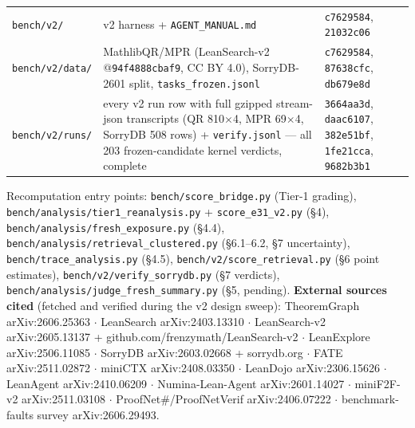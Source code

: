 \documentclass[10pt]{article}
\newcommand{\code}[1]{\texttt{#1}}
\begin{document}
{\begin{longtable}{@{}p{}p{}p{}@{}}
\code{bench/v2/} & v2 harness + \code{AGENT\_MANUAL.md} & \code{c7629584}, \code{21032c06} \\
\code{bench/v2/data/} & MathlibQR/MPR (LeanSearch-v2 @\code{94f4888cbaf9}, CC BY 4.0), SorryDB-2601 split, \code{tasks\_frozen.jsonl} & \code{c7629584}, \code{87638cfc}, \code{db679e8d} \\
\code{bench/v2/runs/} & every v2 run row with full gzipped stream-json transcripts (QR 810$\times$4, MPR 69$\times$4, SorryDB 508 rows) + \code{verify.jsonl} --- all 203 frozen-candidate kernel verdicts, complete & \code{3664aa3d}, \code{daac6107}, \code{382e51bf}, \code{1fe21cca}, \code{9682b3b1} \\
\end{longtable}
}

{\sloppy\scriptsize
\enlargethispage{3\baselineskip}%
Recomputation entry points: \code{bench/score\_bridge.py} (Tier-1 grading),
\code{bench/analysis/tier1\_reanalysis.py} + \code{score\_e31\_v2.py}
(\S4), \code{bench/analysis/fresh\_exposure.py} (\S4.4),
\code{bench/analysis/retrieval\_clustered.py} (\S6.1--6.2, \S7
uncertainty), \code{bench/trace\_analysis.py} (\S4.5),
\code{bench/v2/score\_retrieval.py} (\S6 point estimates),
\code{bench/v2/verify\_sorrydb.py} (\S7 verdicts),
\code{bench/analysis/judge\_fresh\_summary.py} (\S5, pending).
\textbf{External sources cited} (fetched and verified during the v2
design sweep): TheoremGraph arXiv:2606.25363 $\cdot$ LeanSearch
arXiv:2403.13310 $\cdot$ LeanSearch-v2 arXiv:2605.13137 +
github.com/frenzymath/LeanSearch-v2 $\cdot$ LeanExplore arXiv:2506.11085
$\cdot$ SorryDB arXiv:2603.02668 + sorrydb.org $\cdot$ FATE
arXiv:2511.02872 $\cdot$ miniCTX arXiv:2408.03350 $\cdot$ LeanDojo
arXiv:2306.15626 $\cdot$ LeanAgent arXiv:2410.06209 $\cdot$
Numina-Lean-Agent arXiv:2601.14027 $\cdot$ miniF2F-v2 arXiv:2511.03108
$\cdot$ ProofNet\#/ProofNetVerif arXiv:2406.07222 $\cdot$ benchmark-faults
survey arXiv:2606.29493.\par}
\end{document}
